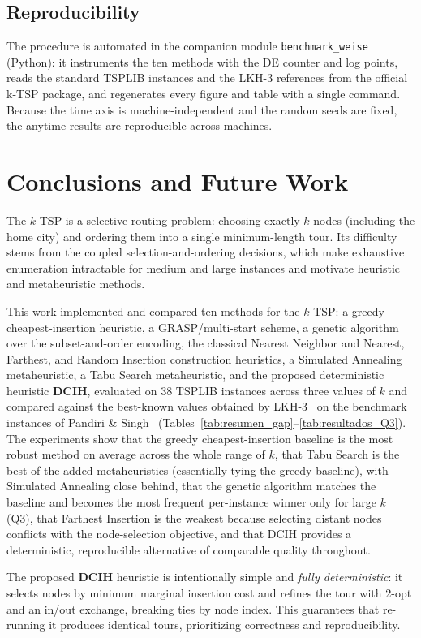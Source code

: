 \documentclass[conference]{IEEEtran}
\begin{document}
\subsection{Reproducibility}
The procedure is automated in the companion module \texttt{benchmark\_weise}
(Python): it instruments the ten methods with the DE counter and log points, reads
the standard TSPLIB instances and the LKH-3 references from the official k-TSP
package, and regenerates every figure and table with a single command. Because the
time axis is machine-independent and the random seeds are fixed, the anytime
results are reproducible across machines.

\section{Conclusions and Future Work}
The $k$-TSP is a selective routing problem: choosing exactly $k$ nodes (including the home city) and ordering them into a single minimum-length tour. Its difficulty stems from the coupled selection-and-ordering decisions, which make exhaustive enumeration intractable for medium and large instances and motivate heuristic and metaheuristic methods.

This work implemented and compared ten methods for the $k$-TSP: a greedy cheapest-insertion heuristic, a GRASP/multi-start scheme, a genetic algorithm over the subset-and-order encoding, the classical Nearest Neighbor and Nearest, Farthest, and Random Insertion construction heuristics, a Simulated Annealing metaheuristic, a Tabu Search metaheuristic, and the proposed deterministic heuristic \textbf{DCIH}, evaluated on 38 TSPLIB instances across three values of $k$ and compared against the best-known values obtained by LKH-3~\cite{Helsgaun} on the benchmark instances of Pandiri \& Singh~\cite{pandiri2020} (Tables~\ref{tab:resumen_gap}--\ref{tab:resultados_Q3}). The experiments show that the greedy cheapest-insertion baseline is the most robust method on average across the whole range of $k$, that Tabu Search is the best of the added metaheuristics (essentially tying the greedy baseline), with Simulated Annealing close behind, that the genetic algorithm matches the baseline and becomes the most frequent per-instance winner only for large $k$ (Q3), that Farthest Insertion is the weakest because selecting distant nodes conflicts with the node-selection objective, and that DCIH provides a deterministic, reproducible alternative of comparable quality throughout.

The proposed \textbf{DCIH} heuristic is intentionally simple and \emph{fully deterministic}: it selects nodes by minimum marginal insertion cost and refines the tour with 2-opt and an in/out exchange, breaking ties by node index. This guarantees that re-running it produces identical tours, prioritizing correctness and reproducibility.
\end{document}
